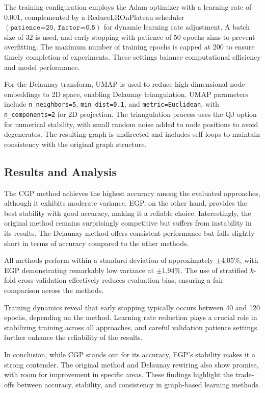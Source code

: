 \documentclass{article}
\theoremstyle{plain}
\theoremstyle{definition}
\theoremstyle{remark}
\begin{document}
The training configuration employs the Adam optimizer with a learning rate of 0.001, 
complemented by a ReduceLROnPlateau scheduler $(\texttt{patience=20, factor=0.5})$ for dynamic learning rate adjustment. 
A batch size of 32 is used, and early stopping with patience of 50 epochs aims to prevent overfitting. 
The maximum number of training epochs is capped at 200 to ensure timely completion 
of experiments. These settings balance computational efficiency and model performance.

For the Delaunay transform, UMAP is used to reduce high-dimensional node embeddings 
to 2D space, enabling Delaunay triangulation. UMAP parameters include \texttt{n\_neighbors=5}, 
\texttt{min\_dist=0.1}, and \texttt{metric=Euclidean}, with \texttt{n\_components=2} 
for 2D projection. The triangulation process uses the QJ option for numerical stability, 
with small random noise added to node positions to avoid degenerates. The resulting 
graph is undirected and includes self-loops to maintain consistency with the original 
graph structure.


\subsection{Results and Analysis}

The CGP method achieves the highest accuracy among the evaluated approaches, 
although it exhibits moderate variance. EGP, on the other hand, provides the best 
stability with good accuracy, making it a reliable choice. Interestingly, the original 
method remains surprisingly competitive but suffers from instability in its results. 
The Delaunay method offers consistent performance but falls slightly short in terms 
of accuracy compared to the other methods.

All methods perform within a standard deviation of approximately $\pm 4.05\%$, 
with EGP demonstrating remarkably low variance at $\pm 1.94\%$. The use of 
stratified $k$-fold cross-validation effectively reduces evaluation bias, 
ensuring a fair comparison across the methods.

Training dynamics reveal that early stopping typically occurs between 40 and 
120 epochs, depending on the method. Learning rate reduction plays a crucial 
role in stabilizing training across all approaches, and careful validation patience 
settings further enhance the reliability of the results.

In conclusion, while CGP stands out for its accuracy, EGP's stability makes it 
a strong contender. The original method and Delaunay rewiring also show promise, 
with room for improvement in specific areas. These findings highlight the trade-offs
between accuracy, stability, and consistency in graph-based learning methods.
\end{document}
